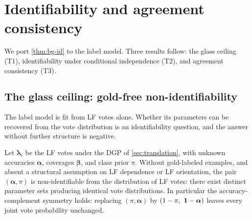 \section{Identifiability and agreement consistency}
\label{sec:identifiability}

We port \cref{thm:bg-id} to the label model. Three results follow:
the glass ceiling (T1), identifiability under conditional
independence (T2), and agreement consistency (T3).

\subsection{The glass ceiling: gold-free non-identifiability}

The label model is fit from LF votes alone. Whether its parameters
can be recovered from the vote distribution is an identifiability
question, and the answer without further structure is negative.

\begin{theorem}
\label{thm:glass-ceiling}
Let $\bm{\lambda}_i$ be the LF votes under the DGP of
\cref{sec:translation}, with unknown accuracies $\bm{\alpha}$,
coverages $\bm{\beta}$, and class prior $\pi$. Without gold-labeled
examples, and absent a structural assumption on LF dependence or LF
orientation, the pair $(\bm{\alpha}, \pi)$ is non-identifiable from
the distribution of LF votes: there exist distinct parameter sets
producing identical vote distributions. In particular the
accuracy-complement symmetry holds: replacing $(\pi, \bm{\alpha})$ by
$(1 - \pi,\ \mathbf{1} - \bm{\alpha})$ leaves every joint vote probability
unchanged.
\end{theorem}

